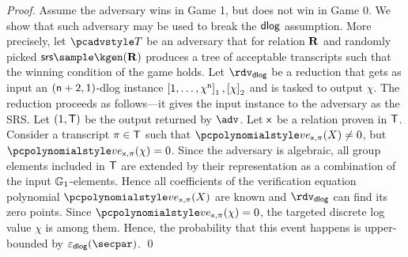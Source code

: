 \documentclass[runningheads,11pt]{llncs}
\begin{document}
\begin{proof}
   Assume the adversary wins in Game 1, but
  does not win in Game 0. We show that such adversary may be used to break the
  $\mathsf{dlog}$ assumption. More precisely, let $\tdv$ be an adversary that for
  relation $\mathbf{R}$ and randomly picked $\srs \sample \kgen(\REL)$ produces a tree
  of acceptable transcripts such that the winning condition of the game
  holds. Let $\rdvdlog$ be a reduction that gets as input an
  $(\mathsf{n} + 2, 1)$-dlog instance $\left[1, \ldots, \chi^{\mathsf{n}}\right]_{1}, \left[\chi\right]_{2}$
  and is tasked to output $\chi$. The reduction proceeds as follows---it gives
  the input instance to the adversary as the SRS. Let $(1, \mathsf{T})$ be the output
  returned by $\adv$. Let $\mathsf{x}$ be a relation proven in $\mathsf{T}$.  Consider a
  transcript $\pi \in \mathsf{T}$ such that $\vereq_{\inp, \zkproof}(X) \neq 0$,
  but $\vereq_{\inp, \zkproof}(\chi) = 0$. Since the adversary is algebraic, all
  group elements included in $\mathsf{T}$ are extended by their representation as a
  combination of the input $\mathbb{G}_1$-elements. Hence all coefficients of the
  verification equation polynomial $\vereq_{\inp, \zkproof}(X)$ are known and
  $\rdvdlog$ can find its zero points. Since
  $\vereq_{\inp, \zkproof}(\chi) = 0$, the targeted discrete log value $\chi$ is
  among them.  Hence, the probability that this event happens is upper-bounded
  by $\epsdlog(\secpar)$. \qed
\end{proof}
\fi
\end{document}
